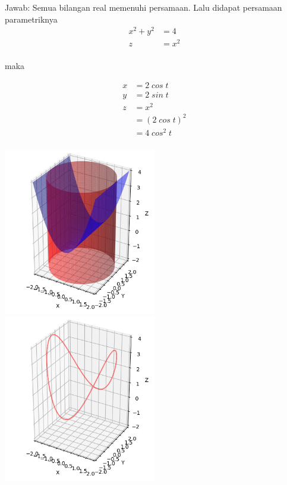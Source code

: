 \documentclass[twoside]{scrarticle}
\begin{document}
\begin{enumerate}
Jawab: Semua bilangan real memenuhi persamaan. Lalu didapat persamaan parametriknya
\begin{equation*}
    \begin{aligned}
        x^2 + y^2 & = 4\\
        z & = x^2\\
    \end{aligned}
\end{equation*}
\centerline{maka}
\begin{equation*}
    \begin{aligned}
        x & =2\;cos\;t\\
        y & =2\;sin\;t\\
        z & = x^2\\
          & = (2\;cos\;t)^2\\
          & = 4\;cos^2\;t\\ 
    \end{aligned}
\end{equation*}

\begin{minipage}{\linewidth}
    \includegraphics[width=0.5\textwidth]{45.png}
    \includegraphics[width=0.5\textwidth]{45_1.png}
\end{minipage}


\end{enumerate}
\end{document}
